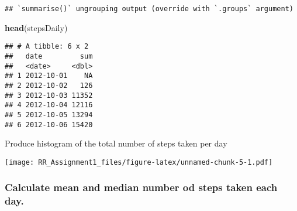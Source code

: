 \documentclass[]{article}
\newenvironment{Shaded}{\begin{snugshade}}{\end{snugshade}}
\newcommand{\DataTypeTok}[1]{\textcolor[rgb]{0.13,0.29,0.53}{#1}}
\newcommand{\DecValTok}[1]{\textcolor[rgb]{0.00,0.00,0.81}{#1}}
\newcommand{\KeywordTok}[1]{\textcolor[rgb]{0.13,0.29,0.53}{\textbf{#1}}}
\newcommand{\NormalTok}[1]{#1}
\newcommand{\OperatorTok}[1]{\textcolor[rgb]{0.81,0.36,0.00}{\textbf{#1}}}
\newcommand{\OtherTok}[1]{\textcolor[rgb]{0.56,0.35,0.01}{#1}}
\newcommand{\StringTok}[1]{\textcolor[rgb]{0.31,0.60,0.02}{#1}}
\begin{document}
\begin{verbatim}
## `summarise()` ungrouping output (override with `.groups` argument)
\end{verbatim}

\begin{Shaded}
\begin{Highlighting}[]
\KeywordTok{head}\NormalTok{(stepsDaily)}
\end{Highlighting}
\end{Shaded}

\begin{verbatim}
## # A tibble: 6 x 2
##   date         sum
##   <date>     <dbl>
## 1 2012-10-01    NA
## 2 2012-10-02   126
## 3 2012-10-03 11352
## 4 2012-10-04 12116
## 5 2012-10-05 13294
## 6 2012-10-06 15420
\end{verbatim}

Produce histogram of the total number of steps taken per day

\begin{Shaded}
\end{Shaded}

\texttt{[image: RR\_Assignment1\_files/figure-latex/unnamed-chunk-5-1.pdf]}

\hypertarget{calculate-mean-and-median-number-od-steps-taken-each-day.}{%
\subsubsection{Calculate mean and median number od steps taken each
day.}\label{calculate-mean-and-median-number-od-steps-taken-each-day.}}

\begin{Shaded}
\end{Shaded}
\end{document}
